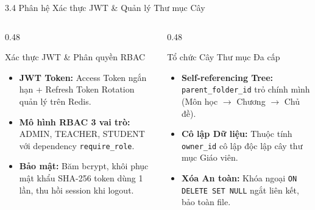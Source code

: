 \documentclass[10pt, aspectratio=169]{beamer}
\begin{document}
\begin{frame}{3.4 Phân hệ Xác thực JWT \& Quản lý Thư mục Cây}
    \begin{columns}[T]
        \begin{column}{0.48\textwidth}
            \begin{block}{Xác thực JWT \& Phân quyền RBAC}
                \begin{itemize}
                    \item \textbf{JWT Token:} Access Token ngắn hạn + Refresh Token Rotation quản lý trên Redis.
                    \item \textbf{Mô hình RBAC 3 vai trò:} ADMIN, TEACHER, STUDENT với dependency \texttt{require\_role}.
                    \item \textbf{Bảo mật:} Băm bcrypt, khôi phục mật khẩu SHA-256 token dùng 1 lần, thu hồi session khi logout.
                \end{itemize}
            \end{block}
        \end{column}

        \begin{column}{0.48\textwidth}
            \begin{alertblock}{Tổ chức Cây Thư mục Đa cấp}
                \begin{itemize}
                    \item \textbf{Self-referencing Tree:} \texttt{parent\_folder\_id} trỏ chính mình (Môn học $\rightarrow$ Chương $\rightarrow$ Chủ đề).
                    \item \textbf{Cô lập Dữ liệu:} Thuộc tính \texttt{owner\_id} cô lập độc lập cây thư mục Giáo viên.
                    \item \textbf{Xóa An toàn:} Khóa ngoại \texttt{ON DELETE SET NULL} ngắt liên kết, bảo toàn file.
                \end{itemize}
            \end{alertblock}
        \end{column}
    \end{columns}
\end{frame}
\end{document}
